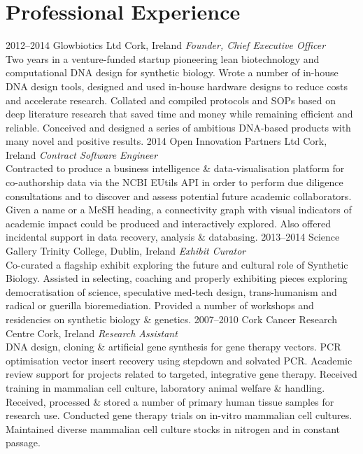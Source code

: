\documentclass[]{friggeri-cv} %
\begin{document}

\section{Professional Experience}

\begin{entrylist}
\entry
{2012--2014}
{Glowbiotics Ltd}
{Cork, Ireland}
{\emph{Founder, Chief Executive Officer} \\
Two years in a venture-funded startup pioneering lean biotechnology and computational
DNA design for synthetic biology. Wrote a number of in-house DNA design tools, designed
and used in-house hardware designs to reduce costs and accelerate research. Collated
and compiled protocols and SOPs based on deep literature research that saved time
and money while remaining efficient and reliable. Conceived and designed a series of
ambitious DNA-based products with many novel and positive results.
}
\entry
{2014}
{Open Innovation Partners Ltd}
{Cork, Ireland}
{\emph{Contract Software Engineer} \\
Contracted to produce a business intelligence \& data-visualisation platform for co-authorship
data via the NCBI EUtils API in order to perform due diligence consultations and to discover
and assess potential future academic collaborators. Given a name or a MeSH heading, a
connectivity graph with visual indicators of academic impact could be produced and interactively
explored. Also offered incidental support in data recovery, analysis \& databasing.
}
\entry
{2013--2014}
{Science Gallery}
{Trinity College, Dublin, Ireland}
{\emph{Exhibit Curator} \\
Co-curated a flagship exhibit exploring the future and cultural role of Synthetic
Biology. Assisted in selecting, coaching and properly exhibiting pieces exploring
democratisation of science, speculative med-tech design, trans-humanism and radical
or guerilla bioremediation. Provided a number of workshops and residencies on synthetic
biology \& genetics.
}
\entry
{2007--2010}
{Cork Cancer Research Centre}
{Cork, Ireland}
{\emph{Research Assistant} \\
DNA design, cloning \& artificial gene synthesis for gene therapy vectors.
PCR optimisation vector insert recovery using stepdown and solvated PCR.
Academic review support for projects related to targeted, integrative gene therapy.
Received training in mammalian cell culture, laboratory animal welfare \& handling.
Received, processed \& stored a number of primary human tissue samples for research use.
Conducted gene therapy trials on in-vitro mammalian cell cultures.
Maintained diverse mammalian cell culture stocks in nitrogen and in constant passage. 
}
\end{entrylist}
\end{document}

